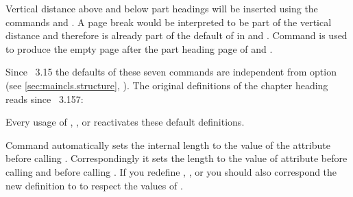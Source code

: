 Vertical distance above and below part headings will be inserted using the
commands  and . A page break
would be interpreted to be part of the vertical distance and therefore is
already part of the default of  in
 and
. Command
 is used to produce the empty page after the part heading
page of  and .

Since \KOMAScript~3.15 the defaults of these seven commands
are independent from option  (see
\autoref{sec:maincls.structure},
). The original definitions of the
chapter heading reads since
\KOMAScript~3.157:
\begin{lstcode}
  \newcommand*{\chapterheadstartvskip}{\vspace{\@tempskipa}}
  \newcommand*{\chapterheadmidvskip}{\par\nobreak\vskip\@tempskipa}
  \newcommand*{\chapterheadendvskip}{\vskip\@tempskipa}
\end{lstcode}
Every usage of ,
, or  reactivates
these default definitions.

Command  automatically sets the internal length
 to the value of the
 attribute
 before calling
. Correspondingly it sets the length to the value
of attribute  before calling  and
 before calling . If you redefine
, , or
 you should also correspond the new definition to
 to respect the values of .

